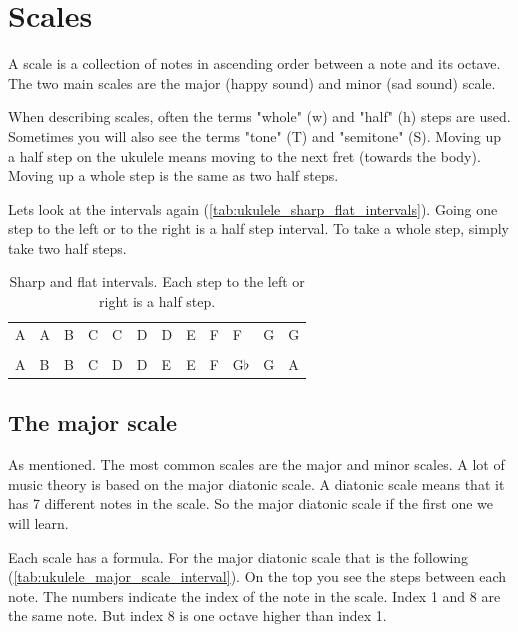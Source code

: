 \section{Scales}

A scale is a collection of notes in ascending order between a note and its octave. The two main scales are the major (happy sound) and minor (sad sound) scale.

When describing scales, often the terms "whole" (w) and "half" (h) steps are used. Sometimes you will also see the terms "tone" (T) and "semitone" (S). Moving up a half step on the ukulele means moving to the next fret (towards the body). Moving up a whole step is the same as two half steps.

Lets look at the intervals again (\autoref{tab:ukulele_sharp_flat_intervals}). Going one step to the left or to the right is a half step interval. To take a whole step, simply take two half steps.

\begin{table}[h]
	\centering
	\begin{tabular}{*{12}{P{5mm}}}
		\large{A} & \large{A\sharp} & \large{B} & \large{C} & \large{C\sharp} & \large{D} & \large{D\sharp} & \large{E} & \large{F} & \large{F\sharp} & \large{G} & \large{G\sharp} \\ \\
		\large{A} & \large{B\flat} & \large{B} & \large{C} & \large{D\flat} & \large{D} & \large{E\flat} & \large{E} & \large{F} & \large{G$\flat$}& \large{G} & \large{A\flat}
	\end{tabular}
	\caption{Sharp and flat intervals. Each step to the left or right is a half step.}
	\label{tab:ukulele_sharp_flat_intervals}
\end{table}

\subsection{The major scale}

As mentioned. The most common scales are the major and minor scales. A lot of music theory is based on the major diatonic scale. A diatonic scale means that it has 7 different notes in the scale. So the major diatonic scale if the first one we will learn.

Each scale has a formula. For the major diatonic scale that is the following (\autoref{tab:ukulele_major_scale_interval}). On the top you see the steps between each note. The numbers indicate the index of the note in the scale. Index 1 and 8 are the same note. But index 8 is one octave higher than index 1.

